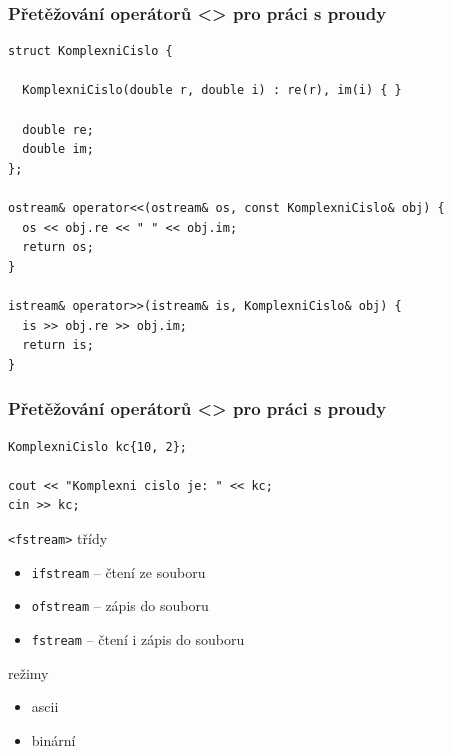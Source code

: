 \begin{frame}[fragile]
\frametitle{Přetěžování operátorů <\/<, >\/> pro práci s proudy}

\begin{yesblock}
\begin{lstlisting}[basicstyle=\small]
struct KomplexniCislo {

  KomplexniCislo(double r, double i) : re(r), im(i) { }

  double re;
  double im;
};

ostream& operator<<(ostream& os, const KomplexniCislo& obj) {
  os << obj.re << " " << obj.im;
  return os;
}

istream& operator>>(istream& is, KomplexniCislo& obj) {
  is >> obj.re >> obj.im;
  return is;
}
\end{lstlisting}
\end{yesblock}
\end{frame}




\begin{frame}[fragile]
\frametitle{Přetěžování operátorů <\/<, >\/> pro práci s proudy}

\begin{yesblock}
\begin{lstlisting}[basicstyle=\small]
KomplexniCislo kc{10, 2};

cout << "Komplexni cislo je: " << kc;
cin >> kc;
\end{lstlisting}
\end{yesblock}
\end{frame}










\begin{frame}[fragile]
\begin{block}{\lstinline|<fstream>| třídy}
\begin{itemize}
\item \lstinline|ifstream| -- čtení ze souboru
\item \lstinline|ofstream| -- zápis do souboru
\item \lstinline|fstream| -- čtení i zápis do souboru
\end{itemize}
\end{block}


\begin{block}{režimy}
\begin{itemize}
\item ascii
\item binární
\end{itemize}
\end{block}
\end{frame}





